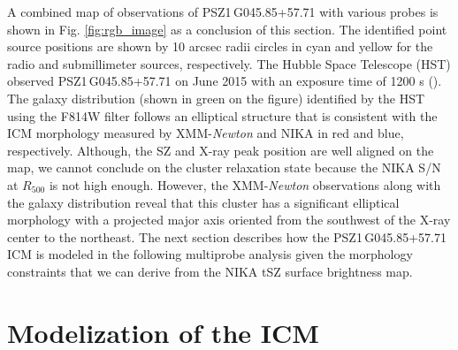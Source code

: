 \documentclass[traditabstract]{aa}
\begin{document}
A combined map of observations of  \mbox{PSZ1\,G045.85+57.71} with various probes is shown in Fig. \ref{fig:rgb_image} as a conclusion of this section. The identified point source positions are shown by 10 arcsec radii circles in cyan and yellow for the radio and submillimeter sources, respectively. The  Hubble Space Telescope (HST) observed \mbox{PSZ1\,G045.85+57.71} on June 2015 with an exposure time of 1200 s (\citealt{HST_followup}). The galaxy distribution (shown in green on the figure) identified by the HST using the F814W filter follows an elliptical structure that is consistent with the ICM morphology measured by XMM-{\it Newton} and NIKA in red and blue, respectively. Although, the SZ and X-ray peak position are well aligned on the map, we cannot conclude on the cluster relaxation state because the NIKA S/N at \mbox{$R_{500}$} is not high enough. However, the XMM-{\it Newton} observations along with the galaxy distribution reveal that this cluster has a significant elliptical morphology with a projected major axis oriented from the southwest of the X-ray center to the northeast. The next section describes how the \mbox{PSZ1\,G045.85+57.71} ICM is modeled in the following multiprobe analysis given the morphology constraints that we can derive from the NIKA tSZ surface brightness map.


\section{Modelization of the ICM}\label{sec:ellipticity}
\end{document}
